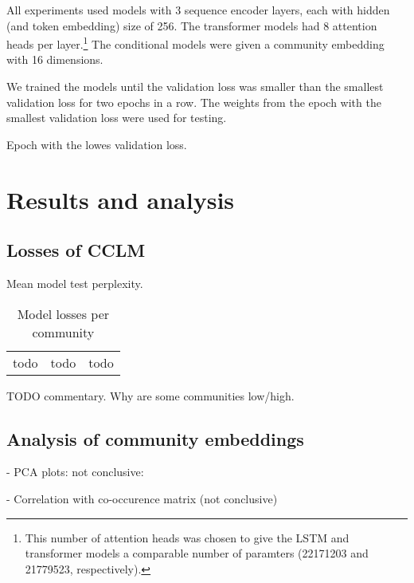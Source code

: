 \documentclass[11pt,a4paper]{article}
\begin{document}
All experiments used models with \num{3} sequence encoder layers, 
each with hidden (and token embedding) size of \num{256}. 
The transformer models had \num{8} attention heads per layer.\footnote{
  This number of attention heads was chosen to give the LSTM and transformer
  models a comparable number of paramters 
  (\num{22171203} and \num{21779523}, respectively).}
The conditional models were given a community embedding with \num{16} dimensions. 

We trained the models until the validation loss was smaller than the smallest
validation loss for two epochs in a row. 
The weights from the epoch with the smallest validation loss were used for testing.

\begin{table}
  \centering
  
  \label{tab:best-epoch}
  \caption{Epoch with the lowes validation loss.}
\end{table}

\section{Results and analysis}

\subsection{Losses of CCLM}

\begin{table*}
  \footnotesize
  \centering
  
  \label{tab:model-ppls}
  \caption{Mean model test perplexity.}
\end{table*}

\begin{table}
  \centering
  \begin{tabular}{ccc}
    todo &todo &todo 
  \end{tabular}
  \caption{Model losses per community}
  \label{tab:losses}
\end{table}
TODO commentary. Why are some communities low/high.

\subsection{Analysis of community embeddings}

- PCA plots: not conclusive:

- Correlation with co-occurence matrix (not conclusive)
\end{document}

